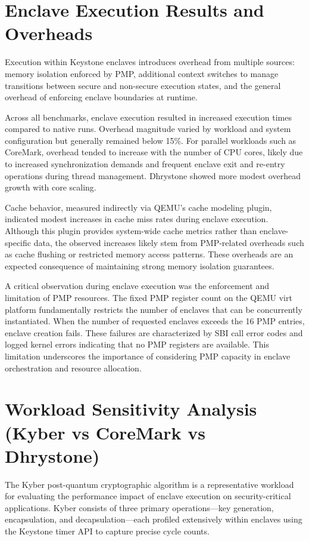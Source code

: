 \section{Enclave Execution Results and Overheads}

Execution within Keystone enclaves introduces overhead from multiple sources: memory isolation enforced by PMP, additional context switches to manage transitions between secure and non-secure execution states, and the general overhead of enforcing enclave boundaries at runtime.

Across all benchmarks, enclave execution resulted in increased execution times compared to native runs. Overhead magnitude varied by workload and system configuration but generally remained below 15\%. For parallel workloads such as CoreMark, overhead tended to increase with the number of CPU cores, likely due to increased synchronization demands and frequent enclave exit and re-entry operations during thread management. Dhrystone showed more modest overhead growth with core scaling.

Cache behavior, measured indirectly via QEMU’s cache modeling plugin, indicated modest increases in cache miss rates during enclave execution. Although this plugin provides system-wide cache metrics rather than enclave-specific data, the observed increases likely stem from PMP-related overheads such as cache flushing or restricted memory access patterns. These overheads are an expected consequence of maintaining strong memory isolation guarantees.

A critical observation during enclave execution was the enforcement and limitation of PMP resources. The fixed PMP register count on the QEMU virt platform fundamentally restricts the number of enclaves that can be concurrently instantiated. When the number of requested enclaves exceeds the 16 PMP entries, enclave creation fails. These failures are characterized by SBI call error codes and logged kernel errors indicating that no PMP registers are available. This limitation underscores the importance of considering PMP capacity in enclave orchestration and resource allocation.

\section{Workload Sensitivity Analysis (Kyber vs CoreMark vs Dhrystone)}

The Kyber post-quantum cryptographic algorithm is a representative workload for evaluating the performance impact of enclave execution on security-critical applications. Kyber consists of three primary operations—key generation, encapsulation, and decapsulation—each profiled extensively within enclaves using the Keystone timer API to capture precise cycle counts.

